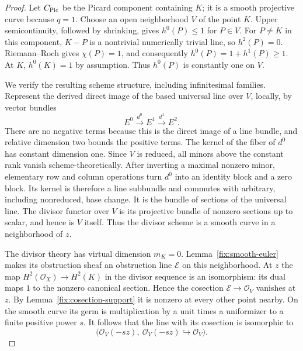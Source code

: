 \begin{proof}
Let \(C_{\operatorname{Pic}}\) be the Picard component containing \(K\);
it is a smooth projective curve because \(q=1\).
Choose an open neighborhood \(V\) of the point \(K\).
Upper semicontinuity, followed by shrinking, gives
\(h^0(P)\le1\) for \(P\in V\).
For \(P\ne K\) in this component, \(K-P\) is a nontrivial
numerically trivial line, so \(h^2(P)=0\).
Riemann--Roch gives \(\chi(P)=1\), and consequently
\(h^0(P)=1+h^1(P)\ge1\).
At \(K\), \(h^0(K)=1\) by assumption.
Thus \(h^0(P)\) is constantly one on \(V\).

We verify the resulting scheme structure, including
infinitesimal families.  Represent the derived direct image
of the based universal line over \(V\), locally, by vector
bundles
\[
 E^0\xrightarrow{d^0}E^1\xrightarrow{d^1}E^2.
\]
There are no negative terms because this is the direct image
of a line bundle, and relative dimension two bounds the
positive terms.  The kernel of the fiber of \(d^0\) has
constant dimension one.  Since \(V\) is reduced, all minors
above the constant rank vanish scheme-theoretically.
After inverting a maximal nonzero minor, elementary row
and column operations turn \(d^0\) into an identity block
and a zero block.  Its kernel is therefore a line
subbundle and commutes with arbitrary, including
nonreduced, base change.  It is the bundle of sections of
the universal line.  The divisor functor over \(V\) is
its projective bundle of nonzero sections up to scalar,
and hence is \(V\) itself.  Thus the divisor scheme is
a smooth curve in a neighborhood of \(z\).

The divisor theory has virtual dimension \(m_K=0\).
Lemma~\ref{fix:smooth-euler} makes its obstruction sheaf
an obstruction line \(\mathcal E\) on this neighborhood.
At \(z\) the map \(H^2(\mathcal O_X)\to H^2(K)\) in
the divisor sequence is an isomorphism: its dual maps
\(1\) to the nonzero canonical section.
Hence the cosection \(\mathcal E\to\mathcal O_V\)
vanishes at \(z\).  By Lemma~\ref{fix:cosection-support}
it is nonzero at every other point nearby.  On the smooth
curve its germ is multiplication by a unit times a
uniformizer to a finite positive power \(s\).
It follows that the line with its cosection is isomorphic to
\[
 \bigl(\mathcal O_V(-sz),\
       \mathcal O_V(-sz)\hookrightarrow\mathcal O_V\bigr).
\]


\end{proof}
